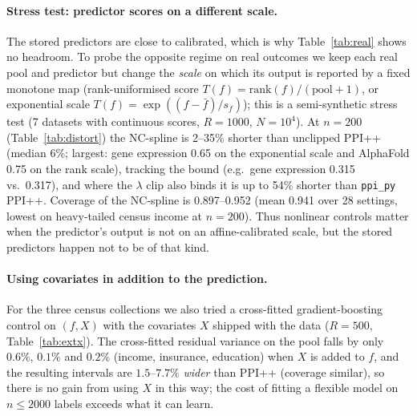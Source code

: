 \documentclass{article}
\begin{document}
\paragraph{Stress test: predictor scores on a different scale.}
The stored predictors are close to calibrated, which is why Table~\ref{tab:real} shows no headroom. To probe the opposite regime on real outcomes we keep each real pool and predictor but change the \emph{scale} on which its output is reported by a fixed monotone map (rank-uniformised score $T(f)=\mathrm{rank}(f)/(\text{pool}+1)$, or exponential scale $T(f)=\exp((f-\bar f)/s_f)$); this is a semi-synthetic stress test (7 datasets with continuous scores, $R=1000$, $N=10^4$). At $n=200$ (Table~\ref{tab:distort}) the NC-spline is 2--35\% shorter than unclipped PPI++ (median 6\%; largest: gene expression 0.65 on the exponential scale and AlphaFold 0.75 on the rank scale), tracking the bound (e.g.\ gene expression 0.315 vs.\ 0.317), and where the $\lambda$ clip also binds it is up to 54\% shorter than \texttt{ppi\_py} PPI++. Coverage of the NC-spline is 0.897--0.952 (mean 0.941 over 28 settings, lowest on heavy-tailed census income at $n=200$). Thus nonlinear controls matter when the predictor's output is not on an affine-calibrated scale, but the stored predictors happen not to be of that kind.

\begin{table}[t]
\centering\small
\caption{Score-scale stress test at $n=200$, $N=10^4$, $R=1000$: width relative to PPI++ (\texttt{ppi\_py}) of unclipped PPI++ and the NC-spline, the efficiency bound, and the NC-spline's coverage. $n=1000$ in \texttt{results/distort\_summary.csv}.}\label{tab:distort}
\resizebox{\linewidth}{!}{}
\end{table}

\paragraph{Using covariates in addition to the prediction.}
For the three census collections we also tried a cross-fitted gradient-boosting control on $(f,X)$ with the covariates $X$ shipped with the data ($R=500$, Table~\ref{tab:extx}). The cross-fitted residual variance on the pool falls by only $0.6\%$, $0.1\%$ and $0.2\%$ (income, insurance, education) when $X$ is added to $f$, and the resulting intervals are $1.5$--$7.7\%$ \emph{wider} than PPI++ (coverage similar), so there is no gain from using $X$ in this way; the cost of fitting a flexible model on $n\le2000$ labels exceeds what it can learn.
\end{document}
